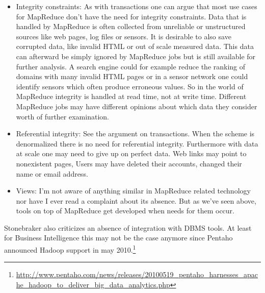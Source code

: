 \documentclass[12pt,a4paper]{scrartcl}		%
\begin{document}
\begin{itemize}
\item Integrity constraints: As with transactions one can argue that most use cases for MapReduce don't have the need for integrity constraints. Data that is handled by MapReduce is often collected from unreliable or unstructured sources like web pages, log files or sensors. It is desirable to also save corrupted data, like invalid HTML or out of scale measured data. This data can afterward be simply ignored by MapReduce jobs but is still available for further analysis. A search engine could for example reduce the ranking of domains with many invalid HTML pages or in a sensor network one could identify sensors which often produce erroneous values. So in the world of MapReduce integrity is handled at read time, not at write time. Different MapReduce jobs may have different opinions about which data they consider worth of further examination.
\item Referential integrity: See the argument on transactions. When the scheme is denormalized there is no need for referential integrity. Furthermore with data at scale one may need to give up on perfect data. Web links may point to nonexistent pages, Users may have deleted their accounts, changed their name or email address.
\item Views: I'm not aware of anything similar in MapReduce related technology nor have I ever read a complaint about its absence. But as we've seen above, tools on top of MapReduce get developed when needs for them occur.
\end{itemize}
Stonebraker also criticizes an absence of integration with DBMS tools. At least for Business Intelligence this may not be the case anymore since Pentaho announced Hadoop support in may 2010.\footnote{\url{http://www.pentaho.com/news/releases/20100519_pentaho_harnesses_apache_hadoop_to_deliver_big_data_analytics.php}}
\end{document}
